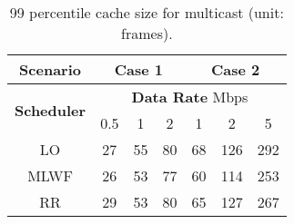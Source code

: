 \documentclass[conference]{IEEEtran}
\newcommand{\0}{\vect{0}}
\newcommand{\1}{\vect{1}}
\begin{document}
\begin{table}[t]
\caption{99 percentile cache size for multicast (unit: frames).}
\label{tab:s5}
\centering
\setlength{\tabcolsep}{.4em}
\resizebox{.28\textwidth }{!}
{
\begin{tabular}{|c|c|c|c|c|c|c|}
\hline
\bfseries Scenario                   & \multicolumn{3}{c|}{\bf Case 1} & \multicolumn{3}{c|}{\bf Case 2} \\ \hline
\multirow{2}{*}{\bfseries Scheduler} & \multicolumn{6}{c|}{{\bf{Data Rate}} Mbps}                 \\ \cline{2-7}
                           & 0.5     & 1       & 2       & 1       & 2       & 5       \\ \hline \hline
LO                         & 27   & 55   & 80  & 68   & 126  & 292  \\ \hline
MLWF                       & 26   & 53   & 77   & 60   & 114  & 253  \\ \hline
RR                         & 29   & 53   & 80  & 65   & 127  & 267  \\ \hline
\end{tabular}
}
\end{table}

\vspace{.7cm}
\end{document}

